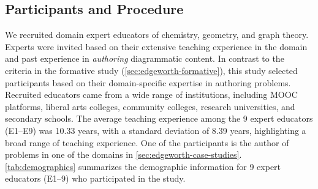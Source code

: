 \subsection{Participants and Procedure}
\label{sec:expert-procedure}

We recruited domain expert educators of chemistry, geometry, and graph theory. Experts were invited based on their extensive teaching experience in the domain and past experience in \emph{authoring} diagrammatic content. In contrast to the criteria in the formative study (\cref{sec:edgeworth-formative}), this study selected participants based on their domain-specific expertise in authoring problems. Recruited educators came from a wide range of institutions, including MOOC platforms, liberal arts colleges, community colleges, research universities, and secondary schools. The average teaching experience among the 9 expert educators (E1–E9) was 10.33 years, with a standard deviation of 8.39 years, highlighting a broad range of teaching experience. One of the participants is the author of problems in one of the domains in \cref{sec:edgeworth-case-studies}.
\cref{tab:demographics} summarizes the demographic information for 9 expert educators (E1--9) who participated in the study. 

